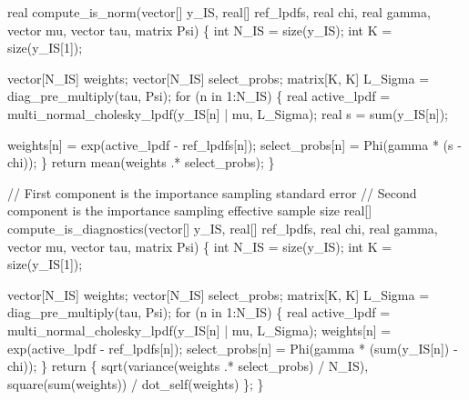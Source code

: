 \documentclass[
  letterpaper,
  DIV=11,
  numbers=noendperiod]{scrartcl}
\newenvironment{Shaded}{\begin{snugshade}}{\end{snugshade}}
\newcommand{\CommentTok}[1]{\textcolor[rgb]{0.37,0.37,0.37}{#1}}
\newcommand{\ControlFlowTok}[1]{\textcolor[rgb]{0.00,0.23,0.31}{#1}}
\newcommand{\DataTypeTok}[1]{\textcolor[rgb]{0.68,0.00,0.00}{#1}}
\newcommand{\DecValTok}[1]{\textcolor[rgb]{0.68,0.00,0.00}{#1}}
\newcommand{\NormalTok}[1]{\textcolor[rgb]{0.00,0.23,0.31}{#1}}
\begin{document}
\begin{codelisting}
\begin{Shaded}
\begin{Highlighting}[]
  \DataTypeTok{real}\NormalTok{ compute\_is\_norm(}\DataTypeTok{vector}\NormalTok{[] y\_IS, }\DataTypeTok{real}\NormalTok{[] ref\_lpdfs,}
                       \DataTypeTok{real}\NormalTok{ chi, }\DataTypeTok{real}\NormalTok{ gamma,}
                       \DataTypeTok{vector}\NormalTok{ mu, }\DataTypeTok{vector}\NormalTok{ tau, }\DataTypeTok{matrix}\NormalTok{ Psi) \{}
    \DataTypeTok{int}\NormalTok{ N\_IS = size(y\_IS);}
    \DataTypeTok{int}\NormalTok{ K = size(y\_IS[}\DecValTok{1}\NormalTok{]);}

    \DataTypeTok{vector}\NormalTok{[N\_IS] weights;}
    \DataTypeTok{vector}\NormalTok{[N\_IS] select\_probs;}
    \DataTypeTok{matrix}\NormalTok{[K, K] L\_Sigma = diag\_pre\_multiply(tau, Psi);}
    \ControlFlowTok{for}\NormalTok{ (n }\ControlFlowTok{in} \DecValTok{1}\NormalTok{:N\_IS) \{}
      \DataTypeTok{real}\NormalTok{ active\_lpdf =}
\NormalTok{        multi\_normal\_cholesky\_lpdf(y\_IS[n] | mu, L\_Sigma);}
      \DataTypeTok{real}\NormalTok{ s = sum(y\_IS[n]);}

\NormalTok{      weights[n] = exp(active\_lpdf {-} ref\_lpdfs[n]);}
\NormalTok{      select\_probs[n] = Phi(gamma * (s {-} chi));}
\NormalTok{    \}}
    \ControlFlowTok{return}\NormalTok{ mean(weights .* select\_probs);}
\NormalTok{  \}}

  \CommentTok{// First component is the importance sampling standard error}
  \CommentTok{// Second component is the importance sampling effective sample size}
  \DataTypeTok{real}\NormalTok{[] compute\_is\_diagnostics(}\DataTypeTok{vector}\NormalTok{[] y\_IS, }\DataTypeTok{real}\NormalTok{[] ref\_lpdfs,}
                                \DataTypeTok{real}\NormalTok{ chi, }\DataTypeTok{real}\NormalTok{ gamma,}
                                \DataTypeTok{vector}\NormalTok{ mu, }\DataTypeTok{vector}\NormalTok{ tau, }\DataTypeTok{matrix}\NormalTok{ Psi) \{}
    \DataTypeTok{int}\NormalTok{ N\_IS = size(y\_IS);}
    \DataTypeTok{int}\NormalTok{ K = size(y\_IS[}\DecValTok{1}\NormalTok{]);}

    \DataTypeTok{vector}\NormalTok{[N\_IS] weights;}
    \DataTypeTok{vector}\NormalTok{[N\_IS] select\_probs;}
    \DataTypeTok{matrix}\NormalTok{[K, K] L\_Sigma = diag\_pre\_multiply(tau, Psi);}
    \ControlFlowTok{for}\NormalTok{ (n }\ControlFlowTok{in} \DecValTok{1}\NormalTok{:N\_IS) \{}
      \DataTypeTok{real}\NormalTok{ active\_lpdf =}
\NormalTok{        multi\_normal\_cholesky\_lpdf(y\_IS[n] | mu, L\_Sigma);}
\NormalTok{      weights[n] = exp(active\_lpdf {-} ref\_lpdfs[n]);}
\NormalTok{      select\_probs[n] = Phi(gamma * (sum(y\_IS[n]) {-} chi));}
\NormalTok{    \}}
    \ControlFlowTok{return}\NormalTok{ \{ sqrt(variance(weights .* select\_probs) / N\_IS),}
\NormalTok{             square(sum(weights)) / dot\_self(weights) \};}
\NormalTok{  \}}


\end{Highlighting}
\end{Shaded}
\end{codelisting}
\end{document}

